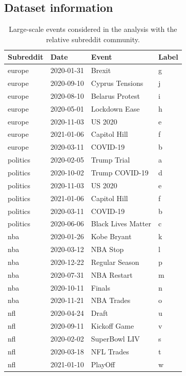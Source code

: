 \documentclass[fleqn,10pt]{wlscirep}
\begin{document}
\subsection*{Dataset information}\label{sm_dataset_info}
%
\begin{table}[h!]
	\centering
    \begin{tabular}{llll}
    \toprule
    {\textbf{Subreddit}} & {\textbf{Date}} & {\textbf{Event}} & {\textbf{Label}}\\
    \midrule
       europe & 2020-01-31 &               Brexit & g\\
       europe & 2020-09-10 &     Cyprus Tensions & j \\
       europe & 2020-08-10 &     Belarus Protest & i \\
       europe & 2020-05-01 &       Lockdown Ease & h \\
       europe & 2020-11-03 &              US 2020 & e \\
       europe & 2021-01-06 &        Capitol Hill & f \\
       europe & 2020-03-11 &             COVID-19 & b \\
     politics & 2020-02-05 &         Trump Trial & a\\
     politics & 2020-10-02 &      Trump COVID-19 & d\\
     politics & 2020-11-03 &              US 2020 & e \\
     politics & 2021-01-06 &        Capitol Hill & f \\
     politics & 2020-03-11 &             COVID-19 & b \\
     politics & 2020-06-06 & Black Lives Matter & c\\
          nba & 2020-01-26 &         Kobe Bryant & k \\
          nba & 2020-03-12 &            NBA Stop & l \\
          nba & 2020-12-22 &      Regular Season & p \\
          nba & 2020-07-31 &         NBA Restart & m \\
          nba & 2020-10-11 &               Finals & n \\
          nba & 2020-11-21 &          NBA Trades  & o \\
          nfl & 2020-04-24 &                Draft & u \\
          nfl & 2020-09-11 &        Kickoff Game  & v \\
          nfl & 2020-02-02 &       SuperBowl LIV & s \\
          nfl & 2020-03-18 &          NFL Trades & t \\
          nfl & 2021-01-10 &              PlayOff & w  \\
    \bottomrule
    \end{tabular}
    \caption{Large-scale events considered in the analysis with the relative subreddit community.} 
\label{tab_sm_data_events}
\end{table}
\end{document}
